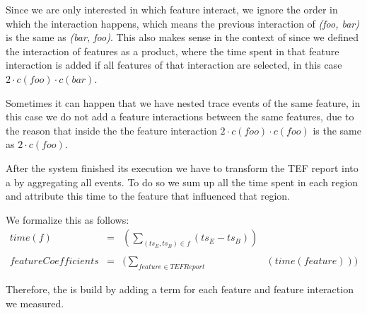 Since we are only interested in which feature interact, we ignore the order in which the interaction happens, which means the previous
interaction of \emph{(foo, bar)} is the same as \emph{(bar, foo)}. This also makes sense in the context of {\perfInfluenceModel} since we defined
the interaction of features as a product, where the time spent in that feature interaction is added if all features of that interaction are selected,
in this case $2 \cdot c(foo) \cdot c(bar)$.

Sometimes it can happen that we have nested trace events of the same feature, in this case we do not add a feature interactions between the same features,
due to the reason that inside the {\perfInfluenceModel} the feature interaction $2 \cdot c(foo) \cdot c(foo)$ is the same as $2 \cdot c(foo)$.

After the system finished its execution we have to transform the TEF report into a {\perfInfluenceModel} by aggregating all events. To do so we sum up 
all the time spent in each region and attribute this time to the feature that influenced that region. 

We formalize this as follows:
\begin{align}
    time(f) &=  &(\sum_{(ts_E, ts_B) \in f}(ts_E - ts_B)) \\ \\
    featureCoefficients &= &(\sum_{feature \in TEFReport}&(time(feature)))
\end{align}


Therefore, the {\perfInfluenceModel} is build by adding a term for each feature and feature interaction we measured.  